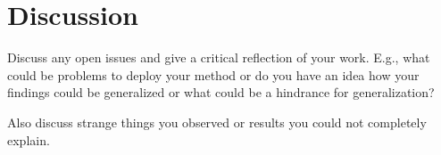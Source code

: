 \chapter{Discussion} \label{sec:discussion}


Discuss any open issues and give a critical reflection of your work. E.g., what could be problems to deploy your method or do you have an idea how your findings could be generalized or what could be a hindrance for generalization?

Also discuss strange things you observed or results you could not completely explain. 

\newpage